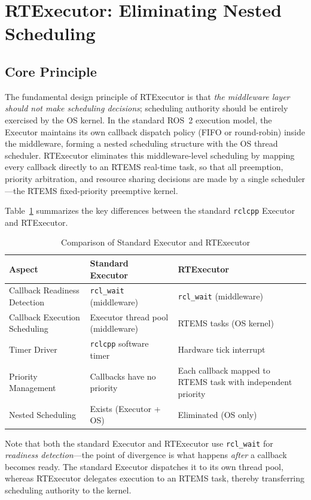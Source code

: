 \section{RTExecutor: Eliminating Nested Scheduling}
\label{sec:design}

\subsection{Core Principle}

The fundamental design principle of RTExecutor is that \emph{the middleware layer should not make scheduling decisions}; scheduling authority should be entirely exercised by the OS kernel.  In the standard ROS~2 execution model, the Executor maintains its own callback dispatch policy (FIFO or round-robin) inside the middleware, forming a nested scheduling structure with the OS thread scheduler.  RTExecutor eliminates this middleware-level scheduling by mapping every callback directly to an RTEMS real-time task, so that all preemption, priority arbitration, and resource sharing decisions are made by a single scheduler---the RTEMS fixed-priority preemptive kernel.

Table~\ref{tab:comparison} summarizes the key differences between the standard \texttt{rclcpp} Executor and RTExecutor.

\begin{table}[t]
\centering
\caption{Comparison of Standard Executor and RTExecutor}
\label{tab:comparison}
\begin{tabular}{p{1.3cm}|p{2.5cm}|p{2.5cm}}
\hline
\textbf{Aspect} & \textbf{Standard Executor} & \textbf{RTExecutor} \\
\hline
\hline
Callback Readiness Detection & \texttt{rcl\_wait} (middleware) & \texttt{rcl\_wait} (middleware) \\
\hline
Callback Execution Scheduling & Executor thread pool (middleware) & RTEMS tasks (OS kernel) \\
\hline
Timer Driver & \texttt{rclcpp} software timer & Hardware tick interrupt \\
\hline
Priority Management & Callbacks have no priority & Each callback mapped to RTEMS task with independent priority \\
\hline
Nested Scheduling & Exists (Executor + OS) & Eliminated (OS only) \\
\hline
\end{tabular}
\end{table}

Note that both the standard Executor and RTExecutor use \texttt{rcl\_wait} for \emph{readiness detection}---the point of divergence is what happens \emph{after} a callback becomes ready.  The standard Executor dispatches it to its own thread pool, whereas RTExecutor delegates execution to an RTEMS task, thereby transferring scheduling authority to the kernel.

